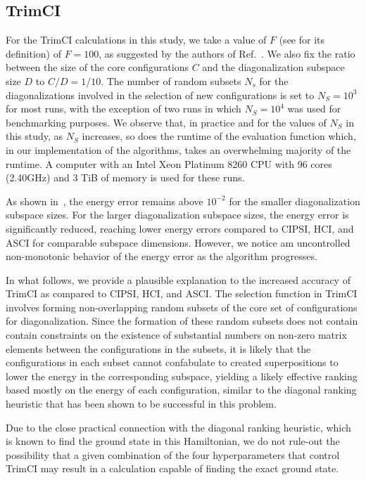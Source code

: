 \documentclass[
  reprint,            %
  amsmath,amssymb,
  aps,
  superscriptaddress, %
  longbibliography
]{revtex4-2}
\theoremstyle{definition}
\begin{document}
\subsection{TrimCI} \label{sec:TrimCI num}
For the TrimCI calculations in this study, we take a value of $F$ (see  for its definition) of ${F = 100}$, as suggested by the authors of Ref.~\cite{zhang2025TrimCI_SCI}. We also fix the ratio between the size of the core configurations $C$ and the diagonalization subspace size $D$ to $C/D = 1/10$. The number of random subsets $N_s$ for the diagonalizations involved in the selection of new configurations is set to $N_S = 10^3$ for most runs, with the exception of two runs in which $N_S = 10^4$ was used for benchmarking purposes. We observe that, in practice and for the values of $N_S$ in this study, as $N_S$ increases, so does the runtime of the evaluation function which, in our implementation of the algorithms, takes an overwhelming majority of the runtime. A computer with an Intel Xeon Platinum 8260 CPU with 96 cores (2.40GHz) and 3 TiB of memory is used for these runs.

As shown in~, the energy error remains above $10^{-2}$ for the smaller diagonalization subspace sizes. For the larger diagonalization subspace sizes, the energy error is significantly reduced, reaching lower energy errors compared to CIPSI, HCI, and ASCI for comparable subspace dimensions. However, we notice am uncontrolled non-monotonic behavior of the energy error as the algorithm progresses. 

In what follows, we provide a plausible explanation to the increased accuracy of TrimCI as compared to CIPSI, HCI, and ASCI. The selection function in TrimCI involves forming non-overlapping random subsets of the core set of configurations for diagonalization. Since the formation of these random subsets does not contain contain constraints on the existence of substantial numbers on non-zero matrix elements between the configurations in the subsets, it is likely that the configurations in each subset cannot confabulate to created superpositions to lower the energy in the corresponding subspace, yielding a likely effective ranking based mostly on the energy of each configuration, similar to the diagonal ranking heuristic that has been shown to be successful in this problem.

Due to the close practical connection with the diagonal ranking heuristic, which is known to find the ground state in this Hamiltonian, we do not rule-out the possibility that a given combination of the four hyperparameters that control TrimCI may result in a calculation capable of finding the exact ground state.
\end{document}
